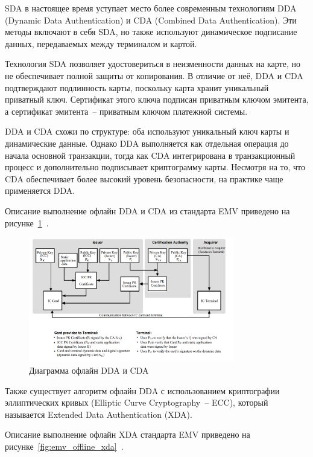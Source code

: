 SDA в настоящее время уступает место более современным технологиям DDA (Dynamic Data Authentication) и CDA (Combined Data Authentication).
Эти методы включают в себя SDA, но также используют динамическое подписание данных, передаваемых между терминалом и картой.

Технология SDA позволяет удостовериться в неизменности данных на карте, но не обеспечивает полной защиты от копирования.
В отличие от неё, DDA и CDA подтверждают подлинность карты, поскольку карта хранит уникальный приватный ключ.
Сертификат этого ключа подписан приватным ключом эмитента, а сертификат эмитента~-- приватным ключом платежной системы.

DDA и CDA схожи по структуре: оба используют уникальный ключ карты и динамические данные.
Однако DDA выполняется как отдельная операция до начала основной транзакции, тогда как CDA интегрирована в транзакционный процесс и дополнительно подписывает криптограмму карты.
Несмотря на то, что CDA обеспечивает более высокий уровень безопасности, на практике чаще применяется DDA.

Описание выполнение офлайн DDA и CDA из стандарта EMV приведено на рисунке~\ref{fig:emv_offline_dda_cda}~\cite{emv_book_2}.

\begin{figure}[H]
    \centering
    \includegraphics[width=0.8\textwidth]{images/research/emv_offline_dda_cda}
    \caption{\centering Диаграмма офлайн DDA и CDA}
    \label{fig:emv_offline_dda_cda}
\end{figure}

Также существует алгоритм офлайн DDA с использованием криптографии эллиптических кривых (Elliptic Curve Cryptography~-- ECC), который называется
Extended Data Authentication (XDA).

Описание выполнение офлайн XDA стандарта EMV приведено на рисунке~\ref{fig:emv_offline_xda}~\cite{emv_book_2}.

